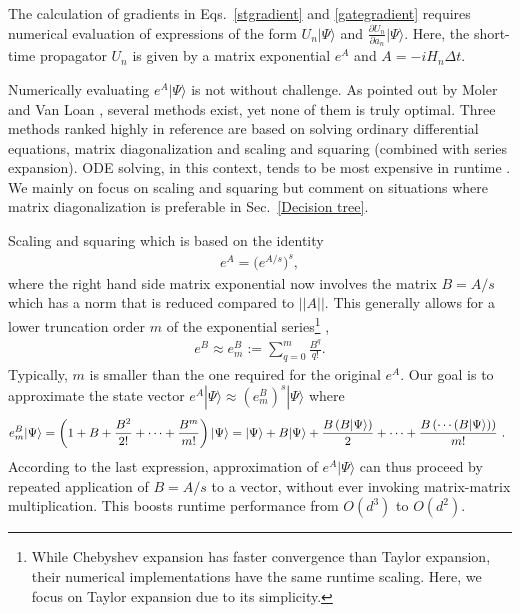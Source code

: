 \documentclass[letterpaper,10pt]{iopart}
\newcommand{\dket}[1]{|#1\rangle}
\newcommand{\norm}[1]{\left|\left|#1\right|\right|}
\newcommand{\parenthesis}[1]{\left(#1\right)}
\begin{document}
The calculation of gradients in Eqs.\ \eqref{stgradient} and \eqref{gategradient} requires numerical evaluation of expressions of the form $U_n\dket{\Psi}$  and $\frac{\partial U_n}{\partial a_n} \dket{\Psi}$. 
Here, the short-time propagator $U_n$ is given by a matrix exponential $e^A$ and $A=-iH_n\Delta t$. 

Numerically evaluating  $e^A\dket{\Psi}$ is not without challenge. As pointed out by Moler and Van Loan \cite{expmoler2003nineteen}, several methods exist, yet none of them is truly optimal. Three methods ranked highly in reference \cite{expmoler2003nineteen} are based on solving ordinary differential equations, matrix diagonalization and scaling and squaring (combined with series expansion). ODE solving, in this context, tends to be most expensive in runtime \cite{semiadgoerz2022quantum}. We mainly on focus on scaling and squaring but comment on situations where matrix diagonalization is preferable in Sec.\ \ref{Decision tree}. 

Scaling and squaring \cite{codenotti1992error} which is based on the identity
\begin{align}
\label{scaling squaring equation}
   e^A=\big(e^{A/s}\big)^s,
\end{align}
where the right hand side matrix exponential now involves the matrix $B=A/s$ which has a norm that is reduced compared to $\norm{A}$. This generally allows for a lower truncation order $m $ of the exponential series\footnote{While Chebyshev expansion has faster convergence than Taylor expansion, their numerical implementations have the same runtime scaling. Here, we focus on Taylor expansion due to its simplicity.} , 
\begin{align}
\label{eBm equation}
    e^B\approx e^B_m:=\sum_{q=0}^m\frac{ B^q}{q!}.
\end{align}
Typically, $m$ is smaller than the one required for the original $e^A$.
Our goal is to approximate the state vector $e^A \dket{\Psi}\approx (e^B_m)^s\dket{\Psi}$ where 
\begin{equation}
\label{eBmpsi}
   e^B_m\dket{\Psi}= \parenthesis{1+B+\frac{B^2}{2!}+\cdots+\frac{B^m}{m!}}\dket{\Psi}\\\nonumber
   =\dket{\Psi}+B\dket{\Psi}+\frac{B\parenthesis{B\dket{\Psi}}}{2}+\cdots+\frac{B\parenthesis{\cdots \parenthesis{B\dket{\Psi}}}}{m!}\text{   . }
\end{equation}
According to the last expression, approximation of $e^A\dket{\Psi}$ can thus proceed by repeated application of $B=A/s$ to a vector, without ever invoking matrix-matrix multiplication. This boosts runtime performance from $O(d^3)$ to $O(d^2)$.
\end{document}
